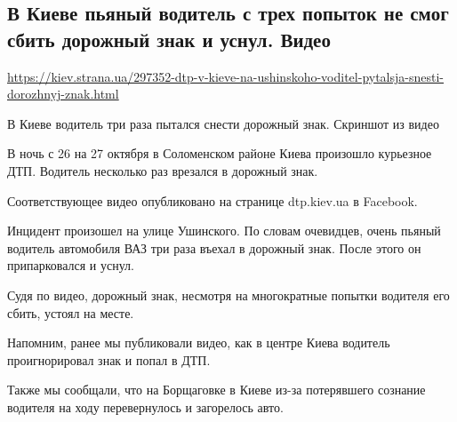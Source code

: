  
 

\subsection{В Киеве пьяный водитель с трех попыток не смог сбить дорожный знак и уснул. Видео}
\label{sec:27_10_2020.news.ua.strana.1.voditel_znak}

\url{https://kiev.strana.ua/297352-dtp-v-kieve-na-ushinskoho-voditel-pytalsja-snesti-dorozhnyj-znak.html}

В Киеве водитель три раза пытался снести дорожный знак. Скриншот из видео

В ночь с 26 на 27 октября в Соломенском районе Киева произошло курьезное ДТП.
Водитель несколько раз врезался в дорожный знак. 

Соответствующее видео опубликовано на странице dtp.kiev.ua в Facebook.

Инцидент произошел на улице Ушинского. По словам очевидцев, очень пьяный
водитель автомобиля ВАЗ три раза въехал в дорожный знак. После этого он
припарковался и уснул. 

Судя по видео, дорожный знак, несмотря на многократные попытки водителя его
сбить, устоял на месте.

Напомним, ранее мы публиковали видео, как в центре Киева водитель
проигнорировал знак и попал в ДТП.

Также мы сообщали, что на Борщаговке в Киеве из-за потерявшего сознание
водителя на ходу перевернулось и загорелось авто.

